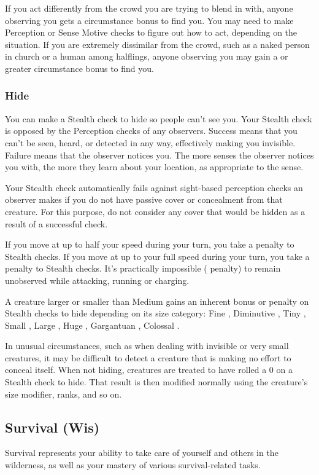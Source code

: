 If you act differently from the crowd you are trying to blend in with, anyone observing you gets a  circumstance bonus to find you. You may need to make Perception or Sense Motive checks to figure out how to act, depending on the situation. If you are extremely dissimilar from the crowd, such as a naked person in church or a human among halflings, anyone observing you may gain a  or greater circumstance bonus to find you. 

\subsubsection{Hide}
You can make a Stealth check to hide so people can't see you. Your Stealth check is opposed by the Perception checks of any observers. Success means that you can't be seen, heard, or detected in any way, effectively making you invisible. Failure means that the observer notices you. The more senses the observer notices you with, the more they learn about your location, as appropriate to the sense. 

Your Stealth check automatically fails against sight-based perception checks an observer makes if you do not have passive cover or concealment from that creature. For this purpose, do not consider any cover that would be hidden as a result of a successful check.

If you move at up to half your speed during your turn, you take a  penalty to Stealth checks. If you move at up to your full speed during your turn, you take a  penalty to Stealth checks. It's practically impossible ( penalty) to remain unobserved while attacking, running or charging.

A creature larger or smaller than Medium gains an inherent bonus or penalty on Stealth checks to hide depending on its size category: Fine , Diminutive , Tiny , Small , Large , Huge , Gargantuan , Colossal .

 In unusual circumstances, such as when dealing with invisible or very small creatures, it may be difficult to detect a creature that is making no effort to conceal itself. When not hiding, creatures are treated to have rolled a 0 on a Stealth check to hide. That result is then modified normally using the creature's size modifier, ranks, and so on.

\subsection{Survival (Wis)}
Survival represents your ability to take care of yourself and others in the wilderness, as well as your mastery of various survival-related tasks. 


